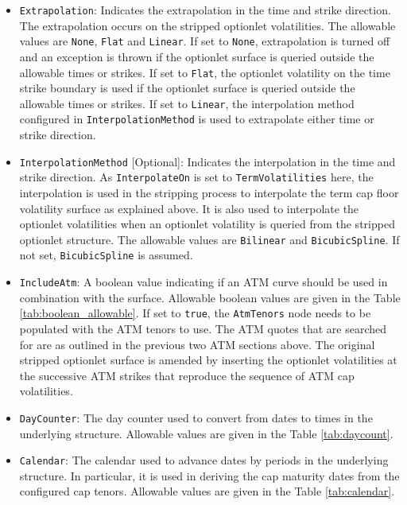 \begin{itemize}
\item \lstinline!Extrapolation!:
Indicates the extrapolation in the time and strike direction. The extrapolation occurs on the stripped optionlet volatilities. The allowable values are \lstinline!None!, \lstinline!Flat! and \lstinline!Linear!. If set to \lstinline!None!, extrapolation is turned off and an exception is thrown if the optionlet surface is queried outside the allowable times or strikes. If set to \lstinline!Flat!, the optionlet volatility on the time strike boundary is used if the optionlet surface is queried outside the allowable times or strikes. If set to \lstinline!Linear!, the interpolation method configured in \lstinline!InterpolationMethod! is used to extrapolate either time or strike direction.

\item \lstinline!InterpolationMethod! [Optional]:
Indicates the interpolation in the time and strike direction. As \lstinline!InterpolateOn! is set to \lstinline!TermVolatilities! here, the interpolation is used in the stripping process to interpolate the term cap floor volatility surface as explained above. It is also used to interpolate the optionlet volatilities when an optionlet volatility is queried from the stripped optionlet structure. The allowable values are \lstinline!Bilinear! and \lstinline!BicubicSpline!. If not set, \lstinline!BicubicSpline! is assumed.

\item \lstinline!IncludeAtm!:
A boolean value indicating if an ATM curve should be used in combination with the surface. Allowable boolean values are given in the Table \ref{tab:boolean_allowable}. If set to \lstinline!true!, the \lstinline!AtmTenors! node needs to be populated with the ATM tenors to use. The ATM quotes that are searched for are as outlined in the previous two ATM sections above. The original stripped optionlet surface is amended by inserting the optionlet volatilities at the successive ATM strikes that reproduce the sequence of ATM cap volatilities.

\item \lstinline!DayCounter!:
The day counter used to convert from dates to times in the underlying structure. Allowable values are given in the Table \ref{tab:daycount}.

\item \lstinline!Calendar!:
The calendar used to advance dates by periods in the underlying structure. In particular, it is used in deriving the cap maturity dates from the configured cap tenors. Allowable values are given in the Table \ref{tab:calendar}.


\end{itemize}
